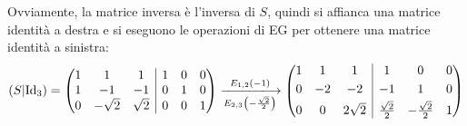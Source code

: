\documentclass[a4paper]{article}
\makeatletter
\newenvironment{rowequmat}[1]{\left(\array{@{}#1@{}}}{\endarray\right)}
\makeatother
\begin{document}
	Ovviamente, la matrice inversa è l'inversa di $S$, quindi si affianca una matrice identità a destra e si eseguono le operazioni di EG per ottenere una matrice identità a sinistra:
	\begin{equation*}
		\left(S|\mathrm{Id}_{3}\right) = \begin{rowequmat}{ccc|ccc}
			1 & 1			& 1			& 1 & 0 & 0 \\
			1 & -1			& -1		& 0 & 1 & 0 \\
			0 & -\sqrt{2}	& \sqrt{2}	& 0 & 0 & 1
		\end{rowequmat}
		\xlongrightarrow[E_{2,3}\left(-\frac{\sqrt{2}}{2}\right)]{E_{1,2}\left(-1\right)}
		\begin{rowequmat}{ccc|ccc}
			1 & 1			& 1			& 1 & 0 & 0 \\ [.3em]
			0 & -2			& -2		& -1 & 1 & 0 \\ [.3em]
			0 & 0	& 2\sqrt{2}	& \frac{\sqrt{2}}{2} & -\frac{\sqrt{2}}{2} & 1
		\end{rowequmat}
	\end{equation*}\newpage
	
\end{document}
